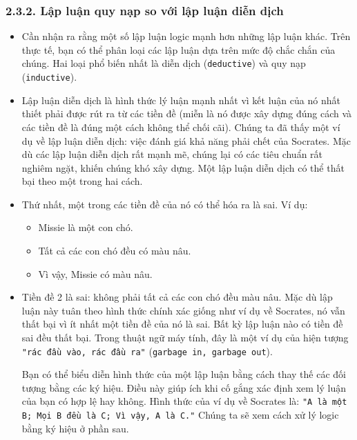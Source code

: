 \subsubsection*{2.3.2. Lập luận quy nạp so với lập luận diễn dịch}

\begin{itemize}
    \item Cần nhận ra rằng một số lập luận logic mạnh hơn những lập luận khác. Trên thực tế, bạn có thể phân loại các lập luận dựa trên mức độ chắc chắn của chúng. Hai loại phổ biến nhất là diễn dịch (\texttt{deductive}) và quy nạp (\texttt{inductive}).

    \item Lập luận diễn dịch là hình thức lý luận mạnh nhất vì kết luận của nó nhất thiết phải được rút ra từ các tiền đề (miễn là nó được xây dựng đúng cách và các tiền đề là đúng một cách không thể chối cãi). Chúng ta đã thấy một ví dụ về lập luận diễn dịch: việc đánh giá khả năng phải chết của Socrates. Mặc dù các lập luận diễn dịch rất mạnh mẽ, chúng lại có các tiêu chuẩn rất nghiêm ngặt, khiến chúng khó xây dựng. Một lập luận diễn dịch có thể thất bại theo một trong hai cách.

    \item Thứ nhất, một trong các tiền đề của nó có thể hóa ra là sai. Ví dụ:
    \begin{itemize}
        \item Missie là một con chó.
        \item Tất cả các con chó đều có màu nâu.
        \item Vì vậy, Missie có màu nâu.
    \end{itemize}

    \item Tiền đề 2 là sai: không phải tất cả các con chó đều màu nâu. Mặc dù lập luận này tuân theo hình thức chính xác giống như ví dụ về Socrates, nó vẫn thất bại vì ít nhất một tiền đề của nó là sai. Bất kỳ lập luận nào có tiền đề sai đều thất bại. Trong thuật ngữ máy tính, đây là một ví dụ của hiện tượng \verb|"rác đầu vào, rác đầu ra"| (\verb|garbage in, garbage out|).

    \begin{tcolorbox}
Bạn có thể biểu diễn hình thức của một lập luận bằng cách thay thế các đối tượng bằng các ký hiệu. Điều này giúp ích khi cố gắng xác định xem lý luận của bạn có hợp lệ hay không. Hình thức của ví dụ về Socrates là: \verb|"A là một B; Mọi B đều là C; Vì vậy, A là C."| Chúng ta sẽ xem cách xử lý logic bằng ký hiệu ở phần sau.
\end{tcolorbox}
\end{itemize}

